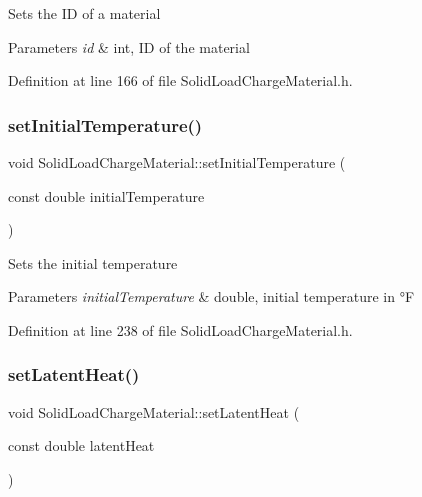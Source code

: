 Sets the ID of a material 
\begin{DoxyParams}{Parameters}
{\em id} & int, ID of the material \\
\hline
\end{DoxyParams}


Definition at line 166 of file Solid\+Load\+Charge\+Material.\+h.

\mbox{\label{class_solid_load_charge_material_ac80e565d26e68e542f4cb41f41b7d96c}} 
\subsubsection{\texorpdfstring{set\+Initial\+Temperature()}{setInitialTemperature()}}
{\footnotesize\ttfamily void Solid\+Load\+Charge\+Material\+::set\+Initial\+Temperature (\begin{DoxyParamCaption}\item[{const double}]{initial\+Temperature }\end{DoxyParamCaption})\hspace{0.3cm}{\ttfamily [inline]}}

Sets the initial temperature 
\begin{DoxyParams}{Parameters}
{\em initial\+Temperature} & double, initial temperature in °F \\
\hline
\end{DoxyParams}


Definition at line 238 of file Solid\+Load\+Charge\+Material.\+h.

\mbox{\label{class_solid_load_charge_material_ac7361119ab7cc352dfbdc6fcb9175981}} 
\subsubsection{\texorpdfstring{set\+Latent\+Heat()}{setLatentHeat()}}
{\footnotesize\ttfamily void Solid\+Load\+Charge\+Material\+::set\+Latent\+Heat (\begin{DoxyParamCaption}\item[{const double}]{latent\+Heat }\end{DoxyParamCaption})\hspace{0.3cm}{\ttfamily [inline]}}

